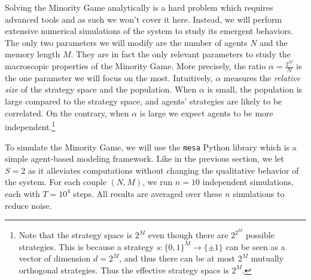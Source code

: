 \documentclass[a4paper, amsfonts, amssymb, amsmath, reprint, showkeys, nofootinbib, twoside]{revtex4-1}
\begin{document}
Solving the Minority Game analytically is a hard problem which requires advanced tools and as such we won't cover it here. Instead, we will perform extensive numerical simulations of the system to study its emergent behaviors. The only two parameters we will modify are the number of agents $N$ and the memory length $M$. They are in fact the only relevant parameters to study the macroscopic properties of the Minority Game. More precisely, the ratio $\alpha = \frac{2^M}{N}$ is the one parameter we will focus on the most. Intuitively, $\alpha$ measures the \textit{relative size} of the strategy space and the population. When $\alpha$ is small, the population is large compared to the strategy space, and agents' strategies are likely to be correlated. On the contrary, when $\alpha$ is large we expect agents to be more independent.\footnote{Note that the strategy space is $2^M$ even though there are $2^{2^M}$ possible strategies. This is because a strategy $s:\{0, 1\}^M \to \{\pm 1\}$ can be seen as a vector of dimension $d=2^M$, and thus there can be at most $2^M$ mutually orthogonal strategies. Thus the effective strategy space is $2^M$.}

To simulate the Minority Game, we will use the \texttt{mesa} Python library which is a simple agent-based modeling framework. Like in the previous section, we let $S=2$ as it alleviates computations without changing the qualitative behavior of the system. For each couple $(N, M)$, we run $n=10$ independent simulations, each with $T=10^4$ steps. All results are averaged over these $n$ simulations to reduce noise.
\end{document}

